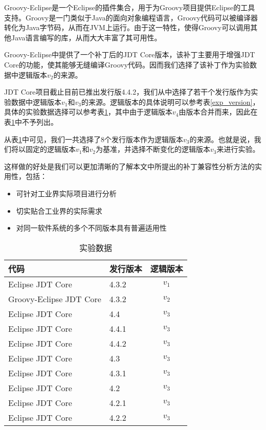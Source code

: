 Groovy-Eclipse是一个Eclipse的插件集合，用于为Groovy项目提供Eclipse的工具支持。Groovy是一门类似于Java的面向对象编程语言，Groovy代码可以被编译器转化为Java字节码，从而在JVM上运行。由于这一特性，使得Groovy可以调用其他Java语言编写的库，从而大大丰富了其可用性。

Groovy-Eclipse中提供了一个补丁后的JDT Core版本，该补丁主要用于增强JDT Core的功能，使其能够无缝编译Groovy代码。因而我们选择了该补丁作为实验数据中逻辑版本$v_2$的来源。

JDT Core项目截止目前已推出发行版4.4.2，我们从中选择了若干个发行版作为实验数据中逻辑版本$v_1$和$v_3$的来源。逻辑版本的具体说明可以参考表\ref {exp_version}，具体的实验数据选择可以参考表\ref {exp_data}，其中由于逻辑版本$v_4$由版本合并而来，因此在表\ref {exp_data}中不予列出。

从表\ref {exp_data}中可见，我们一共选择了8个发行版本作为逻辑版本$v_3$的来源。也就是说，我们将以固定的逻辑版本$v_1$和$v_2$为基准，并选择不断变化的逻辑版本$v_3$来进行实验。

这样做的好处是我们可以更加清晰的了解本文中所提出的补丁兼容性分析方法的实用性，包括：
\begin{itemize}
	\item 可针对工业界实际项目进行分析
	\item 切实贴合工业界的实际需求
	\item 对同一软件系统的多个不同版本具有普遍适用性
\end{itemize}

\begin{table}
	\caption{实验数据}
	\label{exp_data}
	\centering
	\begin{tabular}{llc}
		\toprule[1.5pt]
		{\heiti 代码} & {\heiti 发行版本} & {\heiti 逻辑版本} \\\midrule[1pt]
		Eclipse JDT Core & 4.3.2 & $v_1$ \\
		Groovy-Eclipse JDT Core & 4.3.2 & $v_2$\\
		Eclipse JDT Core & 4.4 & $v_3$\\
		Eclipse JDT Core & 4.4.1 & $v_3$\\
		Eclipse JDT Core & 4.4.2 & $v_3$\\
		Eclipse JDT Core & 4.3 & $v_3$\\
		Eclipse JDT Core & 4.3.1 & $v_3$\\
		Eclipse JDT Core & 4.2 & $v_3$\\
		Eclipse JDT Core & 4.2.1 & $v_3$\\
		Eclipse JDT Core & 4.2.2 & $v_3$\\
		\bottomrule[1.5pt]
	\end{tabular}
\end{table}

